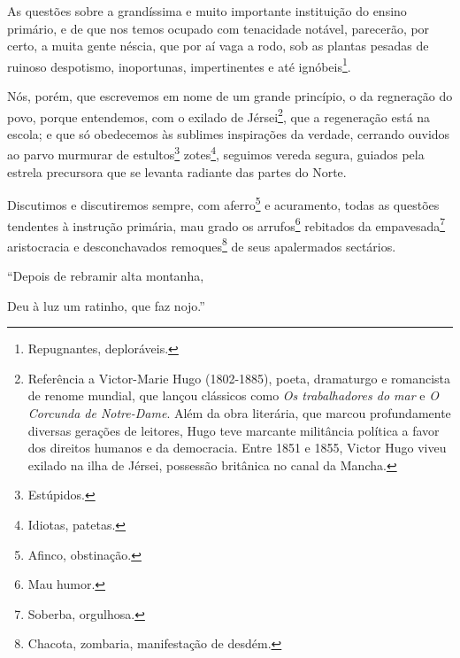 As questões sobre a grandíssima e muito importante instituição do ensino
primário, e de que nos temos ocupado com tenacidade notável, parecerão,
por certo, a muita gente néscia, que por aí vaga a rodo, sob as plantas
pesadas de ruinoso despotismo, inoportunas, impertinentes e até
ignóbeis\footnote{Repugnantes, deploráveis.}.

Nós, porém, que escrevemos em nome de um grande princípio, o da
regneração do povo, porque entendemos, com o exilado de
Jérsei\footnote{Referência a Victor-Marie Hugo (1802-1885), poeta,
  dramaturgo e romancista de renome mundial, que lançou clássicos como
  \emph{Os trabalhadores do mar} e \emph{O Corcunda de Notre-Dame}. Além
  da obra literária, que marcou profundamente diversas gerações de
  leitores, Hugo teve marcante militância política a favor dos direitos
  humanos e da democracia. Entre 1851 e 1855, Victor Hugo viveu exilado
  na ilha de Jérsei, possessão britânica no canal da Mancha.}, que a
regeneração está na escola; e que só obedecemos às sublimes inspirações
da verdade, cerrando ouvidos ao parvo murmurar de estultos\footnote{
  Estúpidos.} zotes\footnote{Idiotas, patetas.}, seguimos vereda
segura, guiados pela estrela precursora que se levanta radiante das
partes do Norte.

Discutimos e discutiremos sempre, com aferro\footnote{Afinco,
  obstinação.} e acuramento, todas as questões tendentes à instrução
primária, mau grado os arrufos\footnote{Mau humor.} rebitados da
empavesada\footnote{Soberba, orgulhosa.} aristocracia e desconchavados
remoques\footnote{Chacota, zombaria, manifestação de desdém.} de seus
apalermados sectários.

``Depois de rebramir alta montanha,

Deu à luz um ratinho, que faz nojo.''

